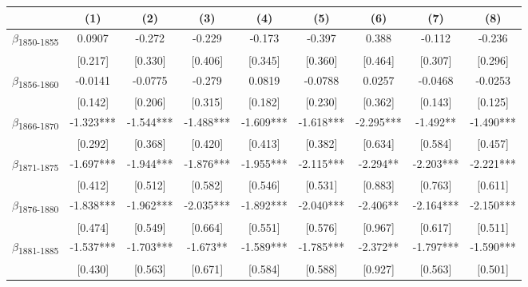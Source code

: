 {
\def\sym#1{\ifmmode^{#1}\else\(^{#1}\)\fi}
\begin{tabular}{l*{8}{c}}
\toprule
            &\multicolumn{1}{c}{(1)}   &\multicolumn{1}{c}{(2)}   &\multicolumn{1}{c}{(3)}   &\multicolumn{1}{c}{(4)}   &\multicolumn{1}{c}{(5)}   &\multicolumn{1}{c}{(6)}   &\multicolumn{1}{c}{(7)}   &\multicolumn{1}{c}{(8)}   \\
\midrule
$\beta$\textsubscript{1850-1855}&      0.0907   &      -0.272   &      -0.229   &      -0.173   &      -0.397   &       0.388   &      -0.112   &      -0.236   \\
            &     [0.217]   &     [0.330]   &     [0.406]   &     [0.345]   &     [0.360]   &     [0.464]   &     [0.307]   &     [0.296]   \\
$\beta$\textsubscript{1856-1860}&     -0.0141   &     -0.0775   &      -0.279   &      0.0819   &     -0.0788   &      0.0257   &     -0.0468   &     -0.0253   \\
            &     [0.142]   &     [0.206]   &     [0.315]   &     [0.182]   &     [0.230]   &     [0.362]   &     [0.143]   &     [0.125]   \\
$\beta$\textsubscript{1866-1870}&      -1.323***&      -1.544***&      -1.488***&      -1.609***&      -1.618***&      -2.295***&      -1.492** &      -1.490***\\
            &     [0.292]   &     [0.368]   &     [0.420]   &     [0.413]   &     [0.382]   &     [0.634]   &     [0.584]   &     [0.457]   \\
$\beta$\textsubscript{1871-1875}&      -1.697***&      -1.944***&      -1.876***&      -1.955***&      -2.115***&      -2.294** &      -2.203***&      -2.221***\\
            &     [0.412]   &     [0.512]   &     [0.582]   &     [0.546]   &     [0.531]   &     [0.883]   &     [0.763]   &     [0.611]   \\
$\beta$\textsubscript{1876-1880}&      -1.838***&      -1.962***&      -2.035***&      -1.892***&      -2.040***&      -2.406** &      -2.164***&      -2.150***\\
            &     [0.474]   &     [0.549]   &     [0.664]   &     [0.551]   &     [0.576]   &     [0.967]   &     [0.617]   &     [0.511]   \\
$\beta$\textsubscript{1881-1885}&      -1.537***&      -1.703***&      -1.673** &      -1.589***&      -1.785***&      -2.372** &      -1.797***&      -1.590***\\
            &     [0.430]   &     [0.563]   &     [0.671]   &     [0.584]   &     [0.588]   &     [0.927]   &     [0.563]   &     [0.501]   \\

\end{tabular}}
